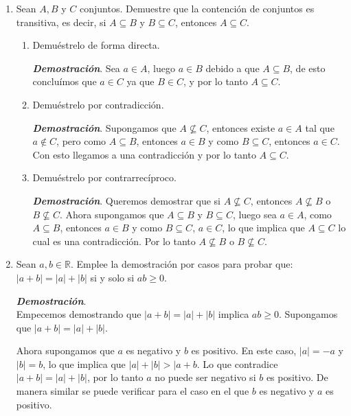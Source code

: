 \documentclass{report}
\begin{document}

    \begin{enumerate}
        \item Sean $A, B$ y $C$ conjuntos. Demuestre que la contención de conjuntos es transitiva, es decir, si $A \subseteq B$ y $B \subseteq C$, entonces $A \subseteq C$.

        \begin{enumerate}
            \item Demuéstrelo de forma directa.

                \textit{\textbf{Demostración}}. Sea $a \in A$, luego $a \in B$ debido a que $A \subseteq B$, de esto concluímos que $a \in C$ ya que $B \in C$, y por lo tanto $A \subseteq C$.

            \item Demuéstrelo por contradicción.

            \textit{\textbf{Demostración}}. Supongamos que $A \not \subseteq C$, entonces existe $a \in A$ tal que $a \not \in C$, pero como $A \subseteq B$, entonces $a \in B$ y como $B \subseteq C$, entonces $a \in C$. Con esto llegamos a una contradicción y por lo tanto $A \subseteq C$.

            \item Demuéstrelo por contrarrecíproco.

            \textit{\textbf{Demostración}}. Queremos demostrar que si $A \not \subseteq C$, entonces $A \not \subseteq B$ o $B \not \subseteq C$. Ahora supongamos que $A \subseteq B$ y $B \subseteq C$, luego sea $a \in A$, como $A \subseteq B$, entonces $a \in B$ y como $B \subseteq C$, $a \in C$, lo que implica que $A \subseteq C$ lo cual es una contradicción. Por lo tanto $A \not \subseteq B$ o $B \not \subseteq C$.
        \end{enumerate}

        \item Sean $a, b \in \mathbb{R}$. Emplee la demostración por casos para probar que: $|a+b|=|a|+|b|$ si y solo si $ab \geq 0$.

        \textit{\textbf{Demostración}}.\\

        Empecemos demostrando que $|a+b| = |a| + |b|$ implica $ab \geq 0$. Supongamos que $|a+b| = |a| + |b|$.

        Ahora supongamos que $a$ es negativo y $b$ es positivo. En este caso, $|a| = -a$ y $|b| = b$, lo que implica que $|a|+|b| > |a +b$. Lo que contradice $|a+b| = |a| + |b|$, por lo tanto $a$ no puede ser negativo si $b$ es positivo. De manera similar se puede verificar para el caso en el que $b$ es negativo y $a$ es positivo.


\end{enumerate}
\end{document}
